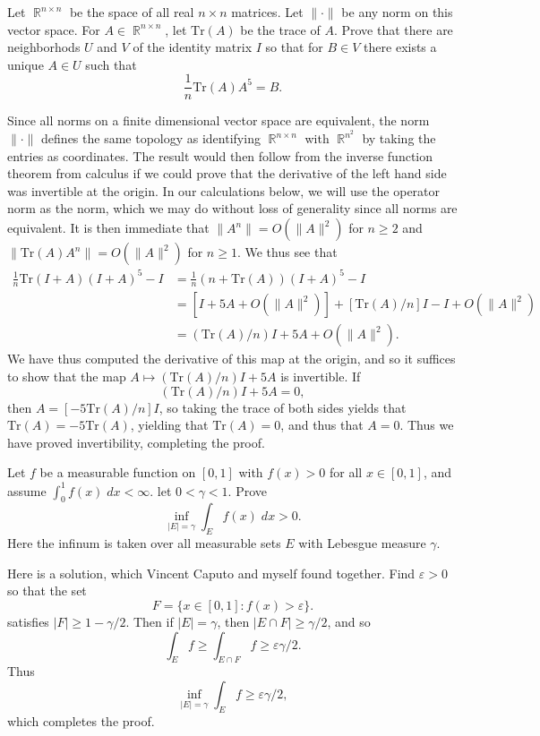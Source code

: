 \documentclass[answers]{exam}
\DeclareMathOperator{\RR}{\mathbb{R}}
\begin{document}
\begin{questions}
\question Let $\RR^{n \times n}$ be the space of all real $n \times n$ matrices. Let $\| \cdot \|$ be any norm on this vector space. For $A \in \RR^{n \times n}$, let $\text{Tr}(A)$ be the trace of $A$. Prove that there are neighborhods $U$ and $V$ of the identity matrix $I$ so that for $B \in V$ there exists a unique $A \in U$ such that
%
\[ \frac{1}{n} \text{Tr}(A) A^5 = B. \]
\begin{solution}
	Since all norms on a finite dimensional vector space are equivalent, the norm $\| \cdot \|$ defines the same topology as identifying $\RR^{n \times n}$ with $\RR^{n^2}$ by taking the entries as coordinates. The result would then follow from the inverse function theorem from calculus if we could prove that the derivative of the left hand side was invertible at the origin. In our calculations below, we will use the operator norm as the norm, which we may do without loss of generality since all norms are equivalent. It is then immediate that $\| A^n \| = O( \| A \|^2 )$ for $n \geq 2$ and $\| \text{Tr}(A) A^n \| = O( \| A \|^2 )$ for $n \geq 1$. We thus see that
	\begin{align*}
		\frac{1}{n} \text{Tr}(I + A) (I + A)^5 - I &= \frac{1}{n} ( n + \text{Tr}(A) ) (I + A)^5 - I\\
		&= [ I + 5 A + O(\| A \|^2) ] + [\text{Tr}(A) / n] I - I + O( \|A\|^2)\\
		&= ( \text{Tr}(A) / n ) I + 5 A + O( \| A \|^2).
	\end{align*}
	We have thus computed the derivative of this map at the origin, and so it suffices to show that the map $A \mapsto ( \text{Tr}(A) / n ) I + 5 A$ is invertible. If
	\[ ( \text{Tr}(A) / n ) I + 5 A = 0, \]
	then $A = [- 5 \text{Tr}(A) / n] I$, so taking the trace of both sides yields that $\text{Tr}(A) = -5 \text{Tr}(A)$, yielding that $\text{Tr}(A) = 0$, and thus that $A = 0$. Thus we have proved invertibility, completing the proof.
\end{solution}

\question Let $f$ be a measurable function on $[0,1]$ with $f(x) > 0$ for all $x \in [0,1]$, and assume $\int_0^1 f(x)\; dx < \infty$. let $0 < \gamma < 1$. Prove
%
\[ \inf_{|E| = \gamma} \int_E f(x)\; dx > 0. \]
%
Here the infinum is taken over all measurable sets $E$ with Lebesgue measure $\gamma$.
\begin{solution}
	Here is a solution, which Vincent Caputo and myself found together. Find $\varepsilon > 0$ so that the set
	\[ F = \{  x\in [0,1] : f(x) > \varepsilon \}. \]
	satisfies $|F| \geq 1 - \gamma / 2$. Then if $|E| = \gamma$, then $|E \cap F| \geq \gamma/2$, and so
	\[ \int_E f \geq \int_{E \cap F} f \geq \varepsilon \gamma / 2. \]
	Thus
	\[ \inf_{|E| = \gamma} \int_E f \geq \varepsilon \gamma / 2, \]
	which completes the proof.


\end{solution}
\end{questions}
\end{document}
